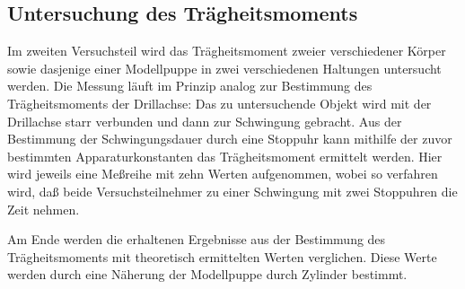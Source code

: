 \subsection{Untersuchung des Trägheitsmoments}

Im zweiten Versuchsteil wird das Trägheitsmoment zweier verschiedener
Körper sowie dasjenige einer Modellpuppe in zwei verschiedenen Haltungen
untersucht werden.  Die Messung läuft im Prinzip analog zur Bestimmung
des Trägheitsmoments der Drillachse: Das zu untersuchende Objekt wird
mit der Drillachse starr verbunden und dann zur Schwingung gebracht.
Aus der Bestimmung der Schwingungsdauer durch eine Stoppuhr kann
mithilfe der zuvor bestimmten Apparaturkonstanten das Trägheitsmoment
ermittelt werden.  Hier wird jeweils eine Meßreihe mit zehn Werten
aufgenommen, wobei so verfahren wird, daß beide Versuchsteilnehmer zu
einer Schwingung mit zwei Stoppuhren die Zeit nehmen.

Am Ende werden die erhaltenen Ergebnisse aus der Bestimmung des
Trägheitsmoments mit theoretisch ermittelten Werten verglichen.  Diese
Werte werden durch eine Näherung der Modellpuppe durch Zylinder
bestimmt.
